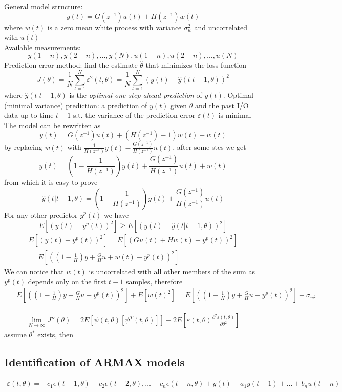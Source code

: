 \documentclass{book}
\begin{document}
General model structure:
\[
    y(t) = G(z^{-1})u(t) + H(z^{-1})w(t)
\]
where $w(t)$ is a zero mean white process with variance $\sigma^2_w$ and uncorrelated with $u(t)$\\
Available measurements:
\[
    y(1-n),y(2-n),\dots,y(N),u(1-n),u(2-n),\dots,u(N)
\]
Prediction error method: find the estimate $\hat{\theta}$ that minimizes the loss function
\[
J(\theta) = \frac{1}{N}\sum_{t=1}^N\varepsilon^2(t,\theta) = \frac{1}{N} \sum_{t=1}^N(y(t)-\hat{y}(t|t-1,\theta))^2
\]
where $\hat{y}(t|t-1,\theta)$ is the \emph{optimal one step ahead prediction} of $y(t)$. Optimal (minimal variance)  prediction: a prediction of $y(t)$ given $\theta$ and the past I/O data up to time $t-1$ s.t. the variance of the prediction error $\varepsilon(t)$ is minimal
The model can be rewritten as
\[
y(t) = G(z^{-1})u(t) + (H(z^{-1})-1)w(t)+w(t)
\]
by replacing $w(t)$ with $\frac{1}{H(z^{-1})}y(t)-\frac{G(z^{-1})}{H(z^{-1})}u(t)$, after some stes we get
\[
    y(t)=\left(1-\frac{1}{H(z^{-1})}\right) y(t) + \frac{G(z^{-1})}{H(z^{-1})}u(t)+w(t)
\]
from which it is easy to prove
\[
    \hat{y}(t|t-1,\theta)=\left(1-\frac{1}{H(z^{-1})}\right)y(t)+\frac{G(z^{-1})}{H(z^{-1})}u(t)
\]
For any other predictor $y^p(t)$ we have
\[
    E[(y(t)-y^p(t))^2]\geq E[(y(t)-\hat{y}(t|t-1,\theta))^2]
\]
\begin{gather*}
    E[(y(t)-y^p(t))^2]=E[(Gu(t)+Hw(t)-y^p(t))^2]\\
    =E[\left(\left(1-\frac{1}{H} \right)y+\frac{G}{H}u+w(t)-y^p(t)\right)^2]
\end{gather*}
We can notice that $w(t)$ is uncorrelated with all other members of the sum as $y^p(t)$ depends only on the first $t-1$ samples, therefore
\begin{gather*}
    =E[\left(\left(1-\frac{1}{H} \right)y+\frac{G}{H}u-y^p(t)\right)^2]+E[w(t)^2]
    =E[\left(\left(1-\frac{1}{H} \right)y+\frac{G}{H}u-y^p(t)\right)^2]+\sigma_{w^2}
\end{gather*}



\begin{gather*}
    \lim_{N\to\infty} J''(\theta)= 2E[\psi(t,\theta)[\psi^T(t,\theta)]] - 2E[\varepsilon(t,\theta)\frac{\partial^2 \varepsilon(t,\theta)}{\partial \theta^2}]
\end{gather*}
assume $\theta^*$ exists, then


\subsection{Identification of ARMAX models}
\begin{gather*}
    \varepsilon(t,\theta)= -c_1\epsilon(t-1,\theta)-c_2\epsilon(t-2,\theta),\dots -c_n\epsilon(t-n,\theta)+y(t)+a_1y(t-1)+\dots + b_nu(t-n)
\end{gather*}
\end{document}
